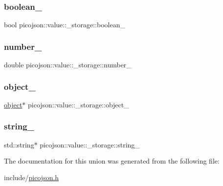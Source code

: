 \hypertarget{unionpicojson_1_1value_1_1__storage_a612a1a8ceb65bdd2e8f09eb33074ba0b}{}\label{unionpicojson_1_1value_1_1__storage_a612a1a8ceb65bdd2e8f09eb33074ba0b} 
\subsubsection{\texorpdfstring{boolean\+\_\+}{boolean\_}}
{\footnotesize\ttfamily bool picojson\+::value\+::\+\_\+storage\+::boolean\+\_\+}

\hypertarget{unionpicojson_1_1value_1_1__storage_a4fc799f222c28156f943a891e510e438}{}\label{unionpicojson_1_1value_1_1__storage_a4fc799f222c28156f943a891e510e438} 
\subsubsection{\texorpdfstring{number\+\_\+}{number\_}}
{\footnotesize\ttfamily double picojson\+::value\+::\+\_\+storage\+::number\+\_\+}

\hypertarget{unionpicojson_1_1value_1_1__storage_ad1feb283e78999609c7a27be95e5f4df}{}\label{unionpicojson_1_1value_1_1__storage_ad1feb283e78999609c7a27be95e5f4df} 
\subsubsection{\texorpdfstring{object\+\_\+}{object\_}}
{\footnotesize\ttfamily \hyperlink{classpicojson_1_1value_a7d7da11d54d7b983a902d28367bda9c1}{object}$\ast$ picojson\+::value\+::\+\_\+storage\+::object\+\_\+}

\hypertarget{unionpicojson_1_1value_1_1__storage_a9ec5aa5b86bbef81b15697c936f58736}{}\label{unionpicojson_1_1value_1_1__storage_a9ec5aa5b86bbef81b15697c936f58736} 
\subsubsection{\texorpdfstring{string\+\_\+}{string\_}}
{\footnotesize\ttfamily std\+::string$\ast$ picojson\+::value\+::\+\_\+storage\+::string\+\_\+}



The documentation for this union was generated from the following file\+:\begin{DoxyCompactItemize}
\item 
include/\hyperlink{picojson_8h}{picojson.\+h}\end{DoxyCompactItemize}
